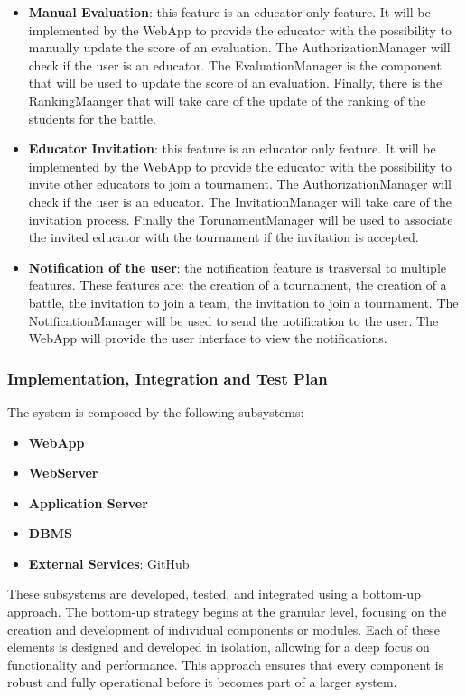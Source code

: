 \begin{itemize}
    \item \textbf{Manual Evaluation}: this feature is an educator only feature. It will be implemented by the WebApp to provide the educator with the possibility to manually update the score of an evaluation. The AuthorizationManager will check if the user is an educator. The EvaluationManager is the component that will be used to update the score of an evaluation. Finally, there is the RankingMaanger that will take care of the update of the ranking of the students for the battle.
    \item \textbf{Educator Invitation}: this feature is an educator only feature. It will be implemented by the WebApp to provide the educator with the possibility to invite other educators to join a tournament. The AuthorizationManager will check if the user is an educator. The InvitationManager will take care of the invitation process. Finally the TorunamentManager will be used to associate the invited educator with the tournament if the invitation is accepted.
    \item \textbf{Notification of the user}: the notification feature is trasversal to multiple features. These features are: the creation of a tournament, the creation of a battle, the invitation to join a team, the invitation to join a tournament. The NotificationManager will be used to send the notification to the user. The WebApp will provide the user interface to view the notifications.
\end{itemize}
\subsubsection{Implementation, Integration and Test Plan}
The system is composed by the following subsystems:
\begin{itemize}
    \item \textbf{WebApp}
    \item \textbf{WebServer}
    \item \textbf{Application Server}
    \item \textbf{DBMS}
    \item \textbf{External Services}: GitHub
\end{itemize}
These subsystems are developed, tested, and integrated using a bottom-up approach.
The bottom-up strategy begins at the granular level, focusing on the creation and development of individual components or modules. Each of these elements is designed and developed in isolation, allowing for a deep focus on functionality and performance. This approach ensures that every component is robust and fully operational before it becomes part of a larger system. 

